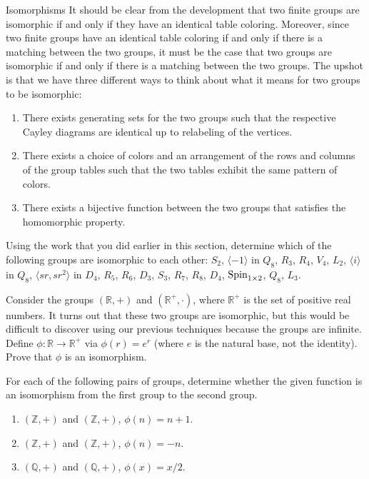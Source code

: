 \begin{section}{Isomorphisms}
It should be clear from the development that two finite groups are isomorphic if and only if they have an identical table coloring.  Moreover, since two finite groups have an identical table coloring if and only if there is a matching between the two groups, it must be the case that two groups are isomorphic if and only if there is a matching between the two groups.  The upshot is that we have three different ways to think about what it means for two groups to be isomorphic:
\begin{enumerate}[label=\rm{(\arabic*)}]
\item There exists generating sets for the two groups such that the respective Cayley diagrams are identical up to relabeling of the vertices.
\item There exists a choice of colors and an arrangement of the rows and columns of the group tables such that the two tables exhibit the same pattern of colors.
\item There exists a bijective function between the two groups that satisfies the homomorphic property.
\end{enumerate}

\begin{problem}
Using the work that you did earlier in this section, determine which of the following groups are isomorphic to each other: $S_2$, $\langle -1\rangle$ in $Q_8$, $R_3$, $R_4$, $V_4$, $L_2$, $\langle i\rangle$ in $Q_8$, $\langle sr, sr^2\rangle$ in $D_4$, $R_5$, $R_6$, $D_3$, $S_3$, $R_7$, $R_8$, $D_4$, $\operatorname{Spin}_{1\times 2}$, $Q_8$, $L_3$.
\end{problem}

\begin{problem}
Consider the groups $(\mathbb{R},+)$ and $(\mathbb{R}^+,\cdot)$, where $\mathbb{R}^+$ is the set of positive real numbers.  It turns out that these two groups are isomorphic, but this would be difficult to discover using our previous techniques because the groups are infinite.  Define $\phi:\mathbb{R}\to \mathbb{R}^+$ via $\phi(r)=e^r$ (where $e$ is the natural base, not the identity). Prove that $\phi$ is an isomorphism.
\end{problem}

\begin{problem}
For each of the following pairs of groups, determine whether the given function is an isomorphism from the first group to the second group.
\begin{enumerate}[label=\rm{(\alph*)}]
\item $(\mathbb{Z},+)$ and $(\mathbb{Z},+)$, $\phi(n)=n+1$.
\item $(\mathbb{Z},+)$ and $(\mathbb{Z},+)$, $\phi(n)=-n$.
\item $(\mathbb{Q},+)$ and $(\mathbb{Q},+)$, $\phi(x)=x/2$.
\end{enumerate}
\end{problem}


\end{section}
